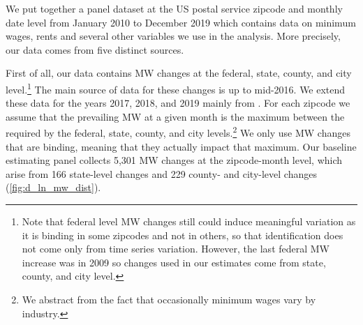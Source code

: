 
We put together a panel dataset at the US postal service zipcode and monthly date level from 
January 2010 to December 2019 which contains data on minimum wages, rents and several other
variables we use in the analysis. More precisely, our data comes from five distinct sources.

First of all, our data contains MW changes at the federal, state, county, and city level.\footnote{
	Note that federal level MW changes still could induce meaningful variation as it is binding in 
	some zipcodes and not in others, so that identification does not come only from time series 
	variation. However, the last federal MW increase was in 2009 so changes used in our estimates 
	come from state, county, and city level.} 
The main source of data for these changes is \textcite{VaghulZipperer2016} up to mid-2016. We 
extend these data for the years 2017, 2018, and 2019 mainly from \textcite{BerkeleyLaborCenter}. 
For each zipcode we assume that the prevailing MW at a given month is the maximum between the 
required by the federal, state, county, and city levels.\footnote{We abstract from the fact that 
	occasionally minimum wages vary by industry.} %
We only use MW changes that are binding, meaning that they actually impact that maximum. Our 
baseline estimating panel collects 5,301 MW changes at the zipcode-month level, which arise 
from 166 state-level changes and 229 county- and city-level changes (\autoref{fig:d_ln_mw_dist}).

